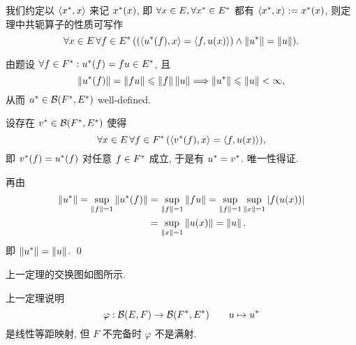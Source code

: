     我们约定以 $ \left\langle x^{*}, x \right\rangle $ 来记 $ x^{*}(x) $, 即 $ \forall x\in E, \forall x^{*}\in E^{*} $ 都有 $ \left\langle x^{*}, x \right\rangle:=x^{*}(x) $, 则定理中共轭算子的性质可写作
    \[
        \forall x\in E\,\forall f\in E^{*}\,((\left\langle u^{*}(f), x \right\rangle=\left\langle f, u(x) \right\rangle)\land\left\| u^{*} \right\|=\left\| u \right\|).
    \]
    \begin{Proof}
        由题设 $ \forall f\in F^{*}: u^{*}(f)=fu\in E^{*} $, 且
        \[
            \left\| u^{*}(f) \right\|=\left\| fu \right\|\leqslant\left\| f \right\|\left\| u \right\|\Longrightarrow\left\| u^{*} \right\|\leqslant\left\| u \right\|<\infty,
        \]
        从而 $ u^{*}\in\mathcal{B}(F^{*}, E^{*}) $ well-defined.

        设存在 $ v^{*}\in\mathcal{B}(F^{*}, E^{*}) $ 使得
        \[
            \forall x\in E\,\forall f\in F^{*}\,(\left\langle v^{*}(f), x \right\rangle=\left\langle f, u(x) \right\rangle),
        \]
        即 $ v^{*}(f)=u^{*}(f) $ 对任意 $ f\in F^{*} $ 成立, 于是有 $ u^{*}=v^{*} $. 唯一性得证.

        再由
        \[
            \begin{aligned}
                \left\| u^{*} \right\|=\sup_{\left\| f \right\|=1}\left\| u^{*}(f) \right\| & = \sup_{\left\| f \right\|=1}\left\| fu \right\|=\sup_{\left\| f \right\|=1}\sup_{\left\| x \right\|=1}\left| f(u(x)) \right| \\
                & = \sup_{\left\| x \right\|=1}\left\| u(x) \right\|=\left\| u \right\|.
            \end{aligned}
        \]
        即 $ \left\| u^{*} \right\|=\left\| u \right\| $. \qed
    \end{Proof}

    上一定理的交换图如图所示.
        \begin{center}
        \end{center}
    \begin{Remark}
        上一定理说明
        \[
            \varphi:\mathcal{B}(E, F)\to \mathcal{B}(F^{*}, E^{*})\qquad u\mapsto u^{*}
        \]
        是线性等距映射, 但 $ F $ 不完备时 $ \varphi $ 不是满射.
    \end{Remark}

